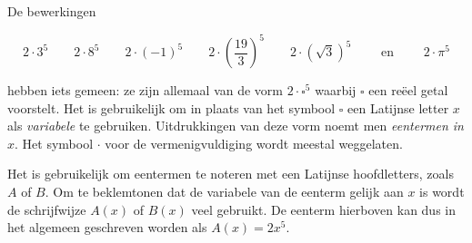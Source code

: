 \documentclass{ximera}
\begin{document}
	\author{Koen de Naeghel - Wiskunde Op Maat}
    \xmsource

	


De bewerkingen

\[
2\cdot 3^5
\qquad 2\cdot 8^5
\qquad 2\cdot (-1)^5
\qquad 2\cdot\left(\frac{19}{3}\right)^5
\qquad 2\cdot\left(\sqrt{3}\right)^5 
\qquad \text{ en } \qquad 2 \cdot \pi^5
\]


hebben iets gemeen: ze zijn allemaal van de vorm $2\cdot \square^5$ waarbij $\square$ een reëel getal voorstelt. Het is gebruikelijk om in plaats van het symbool $\square$ een Latijnse letter $x$ als \textit{ variabele} te gebruiken. Uitdrukkingen van deze vorm noemt men \textit{ eentermen in $x$}. Het symbool $\cdot$ voor de vermenigvuldiging wordt meestal weggelaten. 

Het is gebruikelijk om eentermen te noteren met een Latijnse hoofdletters, zoals $A$ of $B$. Om te beklemtonen dat de variabele van de eenterm gelijk aan $x$ is wordt de schrijfwijze $A(x)$ of $B(x)$ veel gebruikt. De eenterm hierboven kan dus in het algemeen geschreven worden als $A(x) = 2x^5$.

\end{document}
